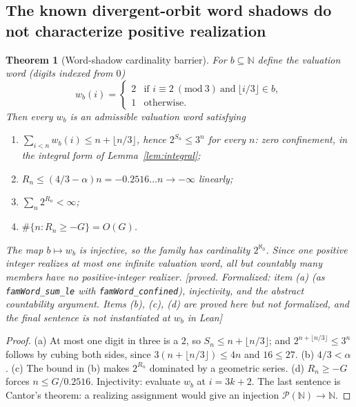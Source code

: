 \documentclass[11pt]{article}
\theoremstyle{plain}
\newtheorem{theorem}{Theorem}[section]
\theoremstyle{definition}
\theoremstyle{remark}
\newcommand{\al}{\alpha}
\newcommand{\status}[1]{\textsf{\footnotesize[#1]}}
\begin{document}
\subsection{The known divergent-orbit word shadows do not characterize positive realization}\label{sec:cardinality}

\begin{theorem}[Word-shadow cardinality barrier]\label{thm:cardinality}
For $b\subseteq\mathbb{N}$ define the valuation word (digits indexed from $0$)
\[
w_b(i)=\begin{cases} 2 & \text{if } i\equiv2\ (\mathrm{mod}\ 3)\ \text{and}\ \lfloor i/3\rfloor\in b,\\
1 & \text{otherwise.}\end{cases}
\]
Then every $w_b$ is an admissible valuation word satisfying
\begin{enumerate}[label=(\alph*),leftmargin=2em]
\item $\sum_{i<n}w_b(i)\le n+\lfloor n/3\rfloor$, hence $2^{S_n}\le3^n$ for every $n$: zero
  confinement, in the integral form of Lemma~\ref{lem:integral};
\item $R_n\le(4/3-\al)n=-0.2516\ldots n\to-\infty$ linearly;
\item $\sum_n 2^{R_n}<\infty$;
\item $\#\{n:R_n\ge-G\}=O(G)$.
\end{enumerate}
The map $b\mapsto w_b$ is injective, so the family has cardinality $2^{\aleph_0}$. Since one
positive integer realizes at most one infinite valuation word, all but countably many members have
\emph{no} positive-integer realizer. \status{proved. Formalized: item (a) (as
\texttt{famWord\_sum\_le} with \texttt{famWord\_confined}), injectivity, and the abstract
countability argument. Items (b), (c), (d) are proved here but \emph{not} formalized, and the final
sentence is not instantiated at $w_b$ in Lean}
\end{theorem}

\begin{proof}
(a) At most one digit in three is a $2$, so $S_n\le n+\lfloor n/3\rfloor$; and
$2^{n+\lfloor n/3\rfloor}\le3^n$ follows by cubing both sides, since
$3(n+\lfloor n/3\rfloor)\le4n$ and $16\le27$. (b) $4/3<\al$. (c) The bound in (b) makes
$2^{R_n}$ dominated by a geometric series. (d) $R_n\ge-G$ forces $n\le G/0.2516$. Injectivity:
evaluate $w_b$ at $i=3k+2$. The last sentence is Cantor's theorem: a realizing assignment would
give an injection $\mathcal{P}(\mathbb{N})\to\mathbb{N}$.
\end{proof}
\end{document}
